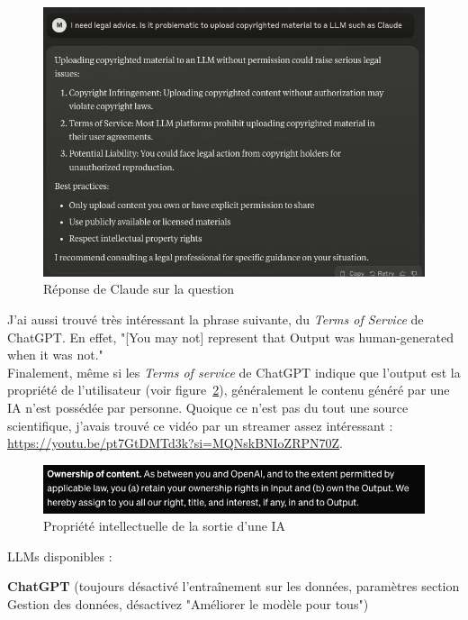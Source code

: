 \documentclass{book}
\begin{document}
\begin{figure}[!h]
    \centering
    \includegraphics[width=\textwidth]{images/legal_claude.png}
    \caption{Réponse de Claude sur la question}\label{fig:claude}
\end{figure}

J'ai aussi trouvé très intéressant la phrase suivante, du \emph{Terms of Service} de ChatGPT. En effet, "[You may not] represent that Output was human-generated when it was not." \\

Finalement, même si les \emph{Terms of service} de ChatGPT indique que l'output est la propriété de l'utilisateur (voir figure~\ref{fig:chatgpt}), généralement le contenu généré par une IA n'est possédée par personne. Quoique ce n'est pas du tout une source scientifique, j'avais trouvé ce vidéo par un streamer assez intéressant : \url{https://youtu.be/pt7GtDMTd3k?si=MQNskBNIoZRPN70Z}.

\begin{figure}[!h]
    \centering
    \includegraphics[width=\textwidth]{images/legal_chatgpt.png} 
    \caption{Propriété intellectuelle de la sortie d'une IA}\label{fig:chatgpt}
\end{figure}
LLMs disponibles : 

\textbf{ChatGPT} (toujours désactivé l’entraînement sur les données, paramètres section Gestion des données, désactivez "Améliorer le modèle pour tous") \\
\end{document}
